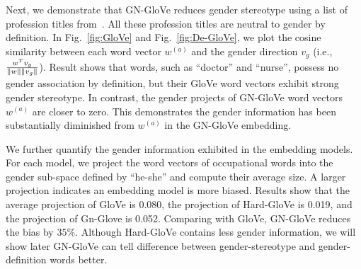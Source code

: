 Next, we demonstrate that GN-GloVe reduces gender stereotype using a list of profession titles from~\cite{kaiwei}. All these profession titles are neutral to gender by definition.
In Fig.~\ref{fig:GloVe} and Fig.~\ref{fig:De-GloVe},
we plot the cosine similarity between each word vector $w^{(a)}$ and the gender direction ${v_g}$ (i.e.,  $\frac{w^T v_g}{\left\lVert w\right\rVert\left\lVert v_g\right\rVert}$). Result shows that words, such as ``doctor'' and ``nurse'', possess no gender association by definition, but their GloVe word vectors exhibit strong gender stereotype. In contrast, the gender projects of GN-GloVe word vectors $w^{(a)}$ are closer to zero. This demonstrates the gender information has been substantially diminished from $w^{(a)}$ in the GN-GloVe embedding.


We further quantify the gender information exhibited in the embedding models.
For each  model, we project the word vectors of occupational words into the gender sub-space defined by ``he-she'' and compute their average size.   A larger projection indicates an embedding model is more biased. Results show that the average projection of GloVe is 0.080, the projection of Hard-GloVe is 0.019, and the projection of Gn-Glove is 0.052. Comparing with GloVe, GN-GloVe reduces the bias by $35\%$. 
Although Hard-GloVe contains less gender information, we will show later GN-GloVe can tell difference between gender-stereotype and gender-definition words better.

